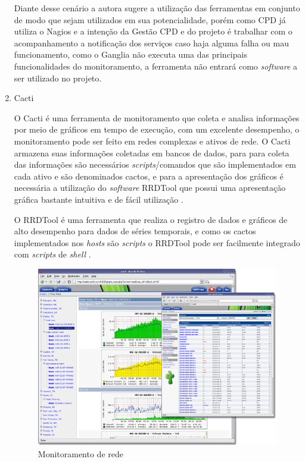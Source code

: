 \begin{enumerate}
\begin{itemize}
\end{itemize}

 Diante desse cenário a autora sugere a utilização das ferramentas em conjunto de modo que sejam utilizados em sua potencialidade, porém como \acrshort{CPD} já utiliza o Nagios e a intenção da Gestão \acrshort{CPD} e do projeto é trabalhar com o acompanhamento a notificação dos serviços caso haja alguma falha ou mau funcionamento, como o Ganglia não executa uma das principais funcionalidades do monitoramento, a ferramenta não entrará como \textit{software} a ser utilizado no projeto.
 
\item Cacti

O Cacti é uma ferramenta de monitoramento que coleta e analisa informações por meio de gráficos em tempo de execução, com um excelente desempenho, o monitoramento pode ser feito em redes complexas e ativos de rede. O Cacti armazena suas informações coletadas em bancos de dados, para para coleta das informações são necessários \textit{scripts}/comandos que são implementados em cada ativo e são denominados cactos, e para a apresentação dos gráficos é necessária a utilização do \textit{software}  \acrfull{RRDTool} que possui uma apresentação gráfica bastante intuitiva e de fácil utilização \cite{cacti}.

O \acrshort{RRDTool} é uma ferramenta que realiza o registro de dados e gráficos de alto desempenho para dados de séries temporais, e como os cactos implementados nos \textit{hosts} são \textit{scripts} o \acrshort{RRDTool} pode ser facilmente integrado com  \textit{scripts} de \textit{shell} \cite{rrdtool}. 

\begin{figure}[h!]
	\begin{center}
	\includegraphics[scale = 0.50]{img/cacti_promo_main.png}
		\caption{Monitoramento de rede \cite{cacti}}
		\label{fun:fig:cacti}
	\end{center}
\end{figure}


\end{enumerate}
